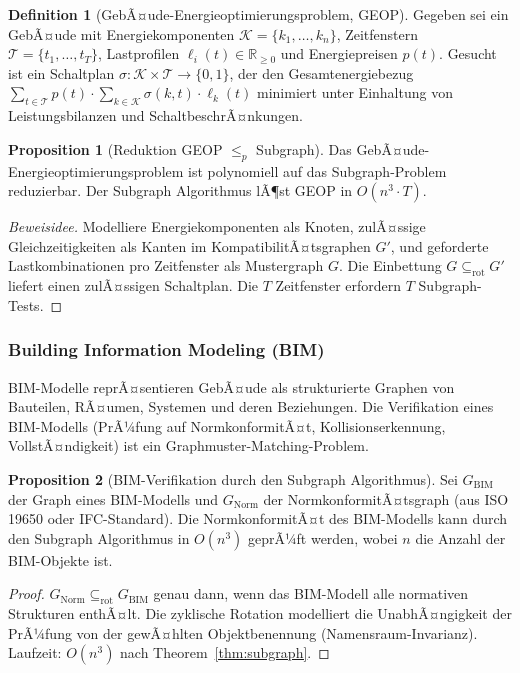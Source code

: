 ﻿\documentclass[a4paper,12pt]{article}
\theoremstyle{definition}
\newtheorem{definition}{Definition}[section]
\newtheorem{proposition}{Proposition}[section]
\begin{document}
\begin{definition}[GebÃ¤ude-Energieoptimierungsproblem, GEOP]
\label{def:geop}
Gegeben sei ein GebÃ¤ude mit Energiekomponenten $\mathcal{K} = \{k_1, \ldots, k_n\}$,
Zeitfenstern $\mathcal{T} = \{t_1, \ldots, t_T\}$, Lastprofilen
$\ell_i(t) \in \mathbb{R}_{\geq 0}$ und Energiepreisen $p(t)$.
Gesucht ist ein Schaltplan $\sigma: \mathcal{K} \times \mathcal{T} \to \{0,1\}$,
der den Gesamtenergiebezug $\sum_{t \in \mathcal{T}} p(t) \cdot \sum_{k \in \mathcal{K}} \sigma(k,t) \cdot \ell_k(t)$
minimiert unter Einhaltung von Leistungsbilanzen und SchaltbeschrÃ¤nkungen.
\end{definition}

\begin{proposition}[Reduktion GEOP $\leq_p$ Subgraph]
Das GebÃ¤ude-Energieoptimierungspro\-blem ist polynomiell auf das Subgraph-Problem
reduzierbar. Der Subgraph Algorithmus lÃ¶st GEOP in $O(n^3 \cdot T)$.
\end{proposition}

\begin{proof}[Beweisidee]
Modelliere Energiekomponenten als Knoten, zulÃ¤ssige Gleichzeitigkeiten als Kanten
im KompatibilitÃ¤tsgraphen $G'$, und geforderte Lastkombinationen pro Zeitfenster
als Mustergraph $G$. Die Einbettung $G \subseteq_{\mathrm{rot}} G'$ liefert einen
zulÃ¤ssigen Schaltplan. Die $T$ Zeitfenster erfordern $T$ Subgraph-Tests.
\end{proof}

\subsubsection{Building Information Modeling (BIM)}

BIM-Modelle reprÃ¤sentieren GebÃ¤ude als strukturierte Graphen von Bauteilen,
RÃ¤umen, Systemen und deren Beziehungen. Die Verifikation eines BIM-Modells
(PrÃ¼fung auf NormkonformitÃ¤t, Kollisionserkennung, VollstÃ¤ndigkeit) ist ein
Graphmuster-Matching-Problem.

\begin{proposition}[BIM-Verifikation durch den Subgraph Algorithmus]
\label{prop:bim}
Sei $G_{\mathrm{BIM}}$ der Graph eines BIM-Modells und $G_{\mathrm{Norm}}$
der NormkonformitÃ¤tsgraph (aus ISO 19650 oder IFC-Standard).
Die NormkonformitÃ¤t des BIM-Modells kann durch den Subgraph Algorithmus
in $O(n^3)$ geprÃ¼ft werden, wobei $n$ die Anzahl der BIM-Objekte ist.
\end{proposition}

\begin{proof}
$G_{\mathrm{Norm}} \subseteq_{\mathrm{rot}} G_{\mathrm{BIM}}$ genau dann,
wenn das BIM-Modell alle normativen Strukturen enthÃ¤lt.
Die zyklische Rotation modelliert die UnabhÃ¤ngigkeit der PrÃ¼fung von der
gewÃ¤hlten Objektbenennung (Namensraum-Invarianz).
Laufzeit: $O(n^3)$ nach Theorem~\ref{thm:subgraph}.
\end{proof}
\end{document}
